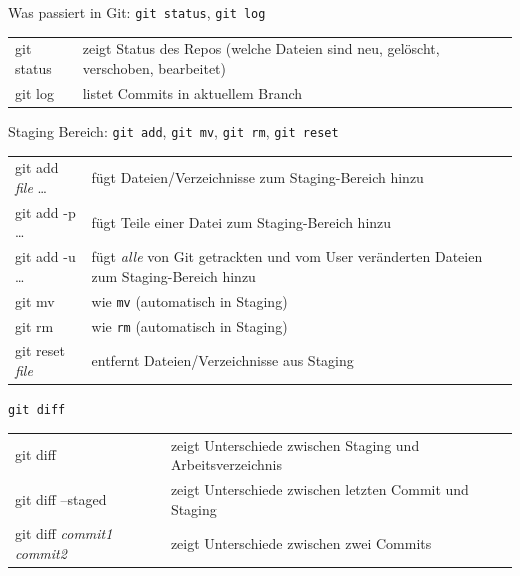 \begin{frame}{Was passiert in Git: \texttt{git status}, \texttt{git log}}
  \begin{tabu}{>{\ttfamily}l X[,L]}
    git status & zeigt Status des Repos (welche Dateien sind neu, gelöscht, verschoben, bearbeitet) \\
    git log    & listet Commits in aktuellem Branch
  \end{tabu}
\end{frame}

\begin{frame}{Staging Bereich: \texttt{git add}, \texttt{git mv}, \texttt{git rm}, \texttt{git reset}}
  \begin{tabu}{>{\ttfamily}l X[,L]}
    git add \textit{file} … & fügt Dateien/Verzeichnisse zum Staging-Bereich hinzu \\
    git add -p …            & fügt Teile einer Datei zum Staging-Bereich hinzu \\
    git add -u …            & fügt \emph{alle} von Git getrackten und vom User veränderten Dateien zum Staging-Bereich hinzu\\
    git mv                  & wie \texttt{mv} (automatisch in Staging)\\
    git rm                  & wie \texttt{rm} (automatisch in Staging) \\
    git reset \textit{file} & entfernt Dateien/Verzeichnisse aus Staging
  \end{tabu}
\end{frame}

\begin{frame}{\texttt{git diff}}
  \begin{tabu}{>{\ttfamily}l X[,L]}
    git diff                                   & zeigt Unterschiede zwischen Staging und Arbeitsverzeichnis \\
    git diff --staged                          & zeigt Unterschiede zwischen letzten Commit und Staging \\
    git diff \textit{commit1} \textit{commit2} & zeigt Unterschiede zwischen zwei Commits
  \end{tabu}
\end{frame}


